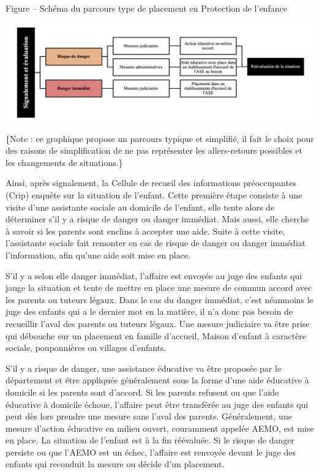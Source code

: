 \documentclass[
  12,
  a4paper,
]{report}
\begin{document}
Figure -- Schéma du parcours type de placement en Protection de
l'enfance

\begin{center}\includegraphics[width=0.8\linewidth]{Figure/SC2} \end{center}

\small\{Note : ce graphique propose un parcours typique et simplifié, il
fait le choix pour des raisons de simplification de ne pas représenter
les allers-retours possibles et les changements de situations.\}

Ainsi, après signalement, la Cellule de recueil des informations
préoccupantes (Crip) enquête sur la situation de l'enfant. Cette
première étape consiste à une visite d'une assistante sociale au
domicile de l'enfant, elle tente alors de déterminer s'il y a risque de
danger ou danger immédiat. Mais aussi, elle cherche à savoir si les
parents sont enclins à accepter une aide. Suite à cette visite,
l'assistante sociale fait remonter en cas de risque de danger ou danger
immédiat l'information, afin qu'une aide soit mise en place.

S'il y a selon elle danger immédiat, l'affaire est envoyée au juge des
enfants qui jauge la situation et tente de mettre en place une mesure de
commun accord avec les parents ou tuteurs légaux. Dans le cas du danger
immédiat, c'est néanmoins le juge des enfants qui a le dernier mot en la
matière, il n'a donc pas besoin de recueillir l'aval des parents ou
tuteurs légaux. Une mesure judiciaire va être prise qui débouche sur un
placement en famille d'accueil, Maison d'enfant à caractère sociale,
pouponnières ou villages d'enfants.

S'il y a risque de danger, une assistance éducative va être proposée par
le département et être appliquée généralement sous la forme d'une aide
éducative à domicile si les parents sont d'accord. Si les parents
refusent ou que l'aide éducative à domicile échoue, l'affaire peut être
transférée au juge des enfants qui peut dès lors prendre une mesure sans
l'aval des parents. Généralement, une mesure d'action éducative en
milieu ouvert, couramment appelée AEMO, est mise en place. La situation
de l'enfant est à la fin réévaluée. Si le risque de danger persiste ou
que l'AEMO est un échec, l'affaire est renvoyée devant le juge des
enfants qui reconduit la mesure ou décide d'un placement.
\end{document}
